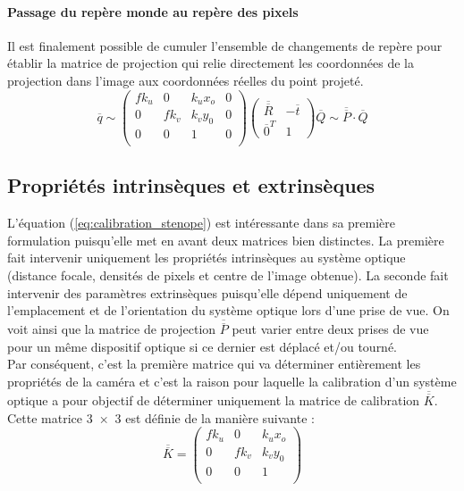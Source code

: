 \documentclass[a4paper, 11pt]{article}
\begin{document}
	\paragraph{Passage du repère monde au repère des pixels\\}
		Il est finalement possible de cumuler l'ensemble de changements de repère pour établir la matrice de projection qui relie directement les coordonnées de la projection dans l'image aux coordonnées réelles du point projeté.
		\begin{equation}\label{eq:calibration_stenope}
			\overline{q} \sim \begin{pmatrix}
				fk_u & 0 & k_ux_o & 0\\
				0 & fk_v & k_vy_0 & 0\\
				0 & 0 & 1 & 0\\
			\end{pmatrix} \begin{pmatrix}
				\overline{\overline{R}} & -\overline{t}\\
				\overline{0}^T & 1
			\end{pmatrix} \overline{Q} \sim \overline{\overline{P}} \cdot \overline{Q}
		\end{equation}
	\subsection*{Propriétés intrinsèques et extrinsèques}
		L'équation (\ref{eq:calibration_stenope}) est intéressante dans sa première formulation puisqu'elle met en avant deux matrices bien distinctes. La première fait intervenir uniquement les propriétés intrinsèques au système optique (distance focale, densités de pixels et centre de l'image obtenue). La seconde fait intervenir des paramètres extrinsèques puisqu'elle dépend uniquement de l'emplacement et de l'orientation du système optique lors d'une prise de vue. On voit ainsi que la matrice de projection $\overline{\overline{P}}$ peut varier entre deux prises de vue pour un même dispositif optique si ce dernier est déplacé et/ou tourné.
		\\Par conséquent, c'est la première matrice qui va déterminer entièrement les propriétés de la caméra et c'est la raison pour laquelle la calibration d'un système optique a pour objectif de déterminer uniquement la matrice de calibration $\overline{\overline{K}}$. Cette matrice \num{3x3} est définie de la manière suivante :
		\begin{equation}
			\overline{\overline{K}} = \begin{pmatrix}
				fk_u & 0 & k_ux_o\\
				0 & fk_v & k_vy_0\\
				0 & 0 & 1\\
			\end{pmatrix}
		\end{equation}
\end{document}
